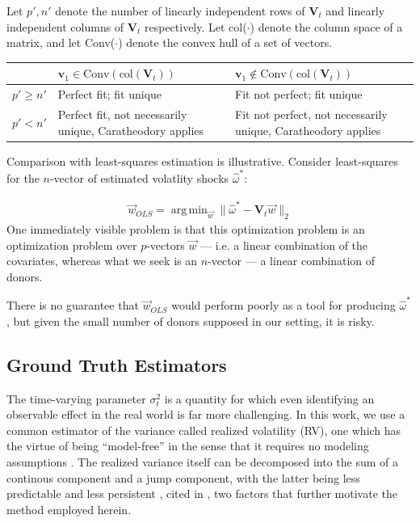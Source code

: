 \documentclass[11pt,3p,review,authoryear]{elsarticle}
\newcommand{\V}{\textbf{V}}
\DeclareMathOperator*{\argmin}{arg\,min} %
\theoremstyle{definition}
\begin{document}
Let $p', n'$ denote the number of linearly independent rows of $\V_{t}$ and linearly independent columns of $\V_{t}$ respectively.  Let col($\cdot$) denote the column space of a matrix, and let Conv($\cdot$) denote the convex hull of a set of vectors.  \\

    \begin{center}
      \begin{tabular}{ | m{3em} | m{7cm}| m{7cm} | } 
        \hline
        & $\textbf{v}_{1}\in \text{Conv}(\text{col}(\V_{t}))$ & $\textbf{v}_{1} \notin \text{Conv}(\text{col}(\V_{t}))$\\ 
        \hline
        $p' \geq n'$ & Perfect fit; fit unique & Fit not perfect; fit unique \\
        \hline
        $p' < n'$ & Perfect fit, not necessarily unique, Caratheodory applies \citep{abadie2022synthetic}& Fit not perfect, not necessarily unique, Caratheodory applies \\ 
        \hline
      \end{tabular}
      \end{center}

Comparison with least-squares estimation is illustrative.  Consider least-squares for the $n$-vector of estimated volatlity shocks $\hat\omega^{*}$:

\begin{align*}{
\vec{w}_{OLS}=\argmin_{\vec{w}} \|\hat{\omega}^{*} - \textbf{V}_{t}\vec{w}\|_{2}}
\end{align*} 
One immediately visible problem is that this optimization problem is an optimization problem over $p$-vectors $\vec{w}$ --- i.e. a linear combination of the covariates, whereas what we seek is an $n$-vector --- a linear combination of donors.

There is no guarantee that $\vec{w}_{OLS}$ would perform poorly as a tool for producing $\hat\omega^{*}$, but given the small number of donors supposed in our setting, it is risky.
    \subsection{Ground Truth Estimators}
    \label{Ground Truth Estimators}
    
    The time-varying parameter $\sigma^{2}_{t}$ is a quantity for which even identifying an observable effect in the real world is far more challenging.  In this work, we use a common estimator of the variance called realized volatility (RV), one which has the virtue of being ``model-free'' in the sense that it requires no modeling assumptions \citep{andersen2010stochastic}.  The realized variance itself can be decomposed into the sum of a continous component and a jump component, with the latter being less predictable and less persistent \citep{andersen2007roughing}, cited in \citet{de2006forecasting}, two factors that further motivate the method employed herein.
    
\end{document}
